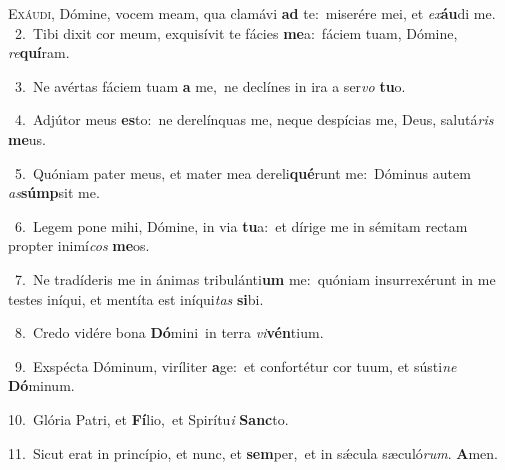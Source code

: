 \lettrine{\initial\textcolor{\initialcolor}{E}}{xáudi,} Dómine, vocem meam, qua clamávi \textbf{ad} te:~\star miserére mei, et \textit{ex}\-\textbf{áu}di me.\\
{\numbfont\textcolor{\numbcolor}{~2.}}~Tibi dixit cor meum, exquisívit te fácies \textbf{me}\-a:~\star fáciem tuam, Dómine, \textit{re}\-\textbf{quí}ram.\par
{\numbfont\textcolor{\numbcolor}{~3.}}~Ne avértas fáciem tuam \textbf{a} me,~\star ne declínes in ira a ser\textit{vo} \textbf{tu}\-o.\par
{\numbfont\textcolor{\numbcolor}{~4.}}~Adjútor meus \textbf{es}\-to:~\star ne derelínquas me, neque despícias me, Deus, salutá\textit{ris} \textbf{me}\-us.\par
{\numbfont\textcolor{\numbcolor}{~5.}}~Quóniam pater meus, et mater mea dereli\-\textbf{qué}\-runt me:~\star Dóminus autem \textit{as}\-\textbf{súmp}sit me.\par
{\numbfont\textcolor{\numbcolor}{~6.}}~Legem pone mihi, Dómine, in via \textbf{tu}\-a:~\star et dírige me in sémitam rectam propter inimí\textit{cos} \textbf{me}\-os.\par
{\numbfont\textcolor{\numbcolor}{~7.}}~Ne tradíderis me in ánimas tribulánti\textbf{um} me:~\star quóniam insurrexérunt in me testes iníqui, et mentíta est iníqui\textit{tas} \textbf{si}\-bi.\par
{\numbfont\textcolor{\numbcolor}{~8.}}~Credo vidére bona \textbf{Dó}\-mini~\star in terra \textit{vi}\-\textbf{vén}tium.\par
{\numbfont\textcolor{\numbcolor}{~9.}}~Exspécta Dóminum, viríliter \textbf{a}\-ge:~\star et confortétur cor tuum, et sústi\textit{ne} \textbf{Dó}\-minum.\par
{\numbfont\textcolor{\numbcolor}{10.}}~Glória Patri, et \textbf{Fí}\-lio,~\star et Spirítu\textit{i} \textbf{Sanc}\-to.\par
{\numbfont\textcolor{\numbcolor}{11.}}~Sicut erat in princípio, et nunc, et \textbf{sem}\-per,~\star et in sǽcula sæculó\-\textit{rum}\-. \textbf{A}\-men.\par
